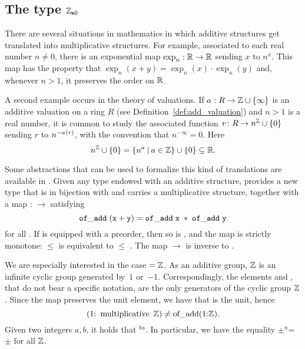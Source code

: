 \documentclass[sigplan,10pt, nonacm, review]{acmart}
\begin{document}
\subsection{\texorpdfstring{The type $\mathbb{Z}_{\mathtt{m}0}$}{The type with\_zero multiplicative Z}}\label{subsection:wzmZZ}
There are several situations in mathematics in which additive structures get translated into multiplicative structures. For example, associated to each real number $n \ne 0$, there is an exponential map $\exp_n : \mathbb{R} \to \mathbb{R}$ sending $x$ to $n^x$. This map has the property that
$\exp_n(x + y) = \exp_n(x) \cdot \exp_n(y)$ and, whenever $n > 1$, it preserves the order on $\mathbb{R}$.

A second example occurs in the theory of valuations. If $\av : R \to \ZZ \cup \{\infty\}$ is an additive valuation on a ring $R$ (see Definition~\ref{def:add_valuation}) and $n > 1$ is a real number, it is common to study the associated function $v \colon R \rightarrow n^{\mathbb{Z}} \cup \{0\}$ sending $r$ to $n^{-\av(r)}$, with the convention that $n^{-\infty} = 0$. Here
\[ n^{\mathbb{Z}} \cup \{0\}=\{n^a \:\vert\: a \in \mathbb{Z}\} \cup \{0\}\subseteq \mathbb{R}. \]

Some abstractions that can be used to formalize this kind of translations are available in \mathlib. Given any type  endowed with an additive structure, \mathlib provides a new type  that is in bijection with  and carries a multiplicative structure, together with a map
 :  $\rightarrow$  satisfying
\[
    \mathtt{\ of\_add\; (x + y) = of\_add\; x\; *\; of\_add\; y\ }
\]
for all . If  is equipped with a preorder, then so is , and the map  is strictly monotone:  $\le$  is equivalent to  $\le$ . The map  $\to$  is inverse to .

We are especially interested in the case  $= \mathbb{Z}$. As an additive group, $\mathbb{Z}$ is an infinite cyclic group generated by~$1$ or~$-1$. Correspondingly, the elements  and , that do not bear a specific notation, are the only generators of the cyclic group \;$\mathbb{Z}$. Since the map  preserves the unit element, we have that  is the unit, hence
\[
\text{\code{(1:}}\;\text{\code{multiplicative} }\ZZ)\neq\text{\code{of_add(1:}}\ZZ\text{\code{)}}.
\]
Given two integers $a, b$, it holds that $^b$$^a$. In particular, we have the equality $\pm$$^n$= $\pm$ for all  $\mathbb{Z}$\code{)}.
\end{document}
